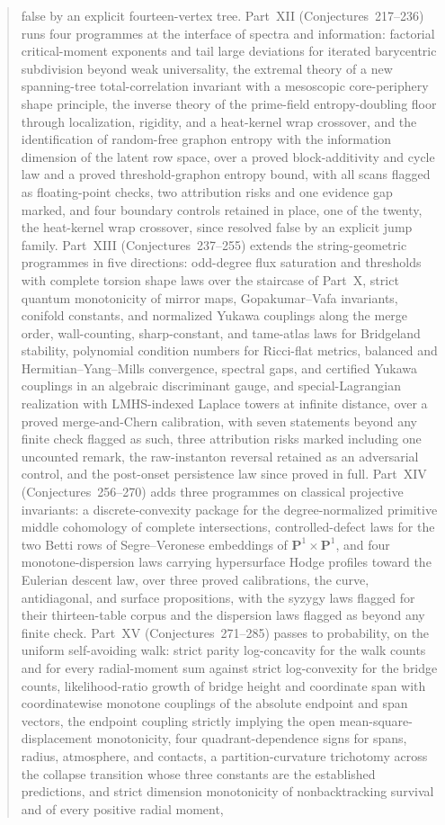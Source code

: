 \documentclass[11pt]{article}
\theoremstyle{definition}
\begin{document}
\begin{abstract}
false by an explicit fourteen-vertex tree.  Part~XII (Conjectures~217--236) runs four programmes at the interface of spectra and information: factorial critical-moment exponents and tail large deviations for iterated barycentric subdivision beyond weak universality, the extremal theory of a new spanning-tree total-correlation invariant with a mesoscopic core-periphery shape principle, the inverse theory of the prime-field entropy-doubling floor through localization, rigidity, and a heat-kernel wrap crossover, and the identification of random-free graphon entropy with the information dimension of the latent row space, over a proved block-additivity and cycle law and a proved threshold-graphon entropy bound, with all scans flagged as floating-point checks, two attribution risks and one evidence gap marked, and four boundary controls retained in place, one of the twenty, the heat-kernel wrap crossover, since resolved false by an explicit jump family.  Part~XIII (Conjectures~237--255) extends the string-geometric programmes in five directions: odd-degree flux saturation and thresholds with complete torsion shape laws over the staircase of Part~X, strict quantum monotonicity of mirror maps, Gopakumar--Vafa invariants, conifold constants, and normalized Yukawa couplings along the merge order, wall-counting, sharp-constant, and tame-atlas laws for Bridgeland stability, polynomial condition numbers for Ricci-flat metrics, balanced and Hermitian--Yang--Mills convergence, spectral gaps, and certified Yukawa couplings in an algebraic discriminant gauge, and special-Lagrangian realization with LMHS-indexed Laplace towers at infinite distance, over a proved merge-and-Chern calibration, with seven statements beyond any finite check flagged as such, three attribution risks marked including one uncounted remark, the raw-instanton reversal retained as an adversarial control, and the post-onset persistence law since proved in full.  Part~XIV (Conjectures~256--270) adds three programmes on classical projective invariants: a discrete-convexity package for the degree-normalized primitive middle cohomology of complete intersections, controlled-defect laws for the two Betti rows of Segre--Veronese embeddings of $\mathbf P^1\times\mathbf P^1$, and four monotone-dispersion laws carrying hypersurface Hodge profiles toward the Eulerian descent law, over three proved calibrations, the curve, antidiagonal, and surface propositions, with the syzygy laws flagged for their thirteen-table corpus and the dispersion laws flagged as beyond any finite check.  Part~XV (Conjectures~271--285) passes to probability, on the uniform self-avoiding walk: strict parity log-concavity for the walk counts and for every radial-moment sum against strict log-convexity for the bridge counts, likelihood-ratio growth of bridge height and coordinate span with coordinatewise monotone couplings of the absolute endpoint and span vectors, the endpoint coupling strictly implying the open mean-square-displacement monotonicity, four quadrant-dependence signs for spans, radius, atmosphere, and contacts, a partition-curvature trichotomy across the collapse transition whose three constants are the established predictions, and strict dimension monotonicity of nonbacktracking survival and of every positive radial moment, 
\end{abstract}
\end{document}

